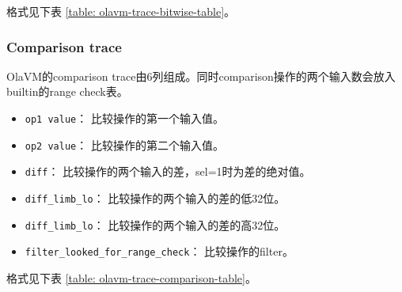 格式见下表 \ref{table: olavm-trace-bitwise-table}。

\begin{table}[!ht]
    \centering {}
    \caption{OlaVM的bitwise的trace表结构}
    \label{table: olavm-trace-bitwise-table}
\end{table}

\subsubsection{Comparison trace}\label{subsubsec: olavm-comparison-trace}
OlaVM的comparison trace由6列组成。同时comparison操作的两个输入数会放入builtin的range check表。
\begin{itemize}
    \item \verb|op1 value|： 比较操作的第一个输入值。
    \item \verb|op2 value|： 比较操作的第二个输入值。
    \item \verb|diff|： 比较操作的两个输入的差，sel=1时为差的绝对值。
    \item \verb|diff_limb_lo|： 比较操作的两个输入的差的低32位。
    \item \verb|diff_limb_lo|： 比较操作的两个输入的差的高32位。
    \item \verb|filter_looked_for_range_check|： 比较操作的filter。
\end{itemize}

格式见下表 \ref{table: olavm-trace-comparison-table}。

\begin{table}[!ht]
    \centering {}
    \caption{OlaVM的comparison的trace表结构}
    \label{table: olavm-trace-comparison-table}
\end{table}